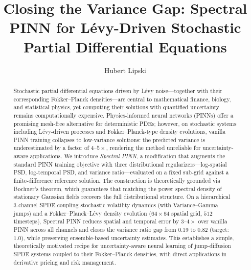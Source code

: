 \documentclass[times,12pt]{elsarticle}
\begin{document}
\begin{frontmatter}


\title{Closing the Variance Gap: Spectral PINN for L\'evy-Driven Stochastic Partial Differential Equations}

\author{Hubert Lipski}



\begin{abstract}
Stochastic partial differential equations driven by L\'evy noise---together with their corresponding Fokker--Planck densities---are central to mathematical finance, biology, and statistical physics, yet computing their solutions with quantified uncertainty remains computationally expensive. Physics-informed neural networks (PINNs) offer a promising mesh-free alternative for deterministic PDEs; however, on stochastic systems including L\'evy-driven processes and Fokker--Planck-type density evolutions, vanilla PINN training collapses to low-variance solutions: the predicted variance is underestimated by a factor of $4$--$5\times$, rendering the method unreliable for uncertainty-aware applications.
We introduce \emph{Spectral PINN}, a modification that augments the standard PINN training objective with three distributional regularizers---log-spatial PSD, log-temporal PSD, and variance ratio---evaluated on a fixed sub-grid against a finite-difference reference solution. The construction is theoretically grounded via Bochner's theorem, which guarantees that matching the power spectral density of stationary Gaussian fields recovers the full distributional structure.
On a hierarchical 3-channel SPDE coupling stochastic volatility dynamics (with Variance--Gamma jumps) and a Fokker--Planck--L\'evy density evolution ($64\times64$ spatial grid, $512$ timesteps), Spectral PINN reduces spatial and temporal error by $3$--$4\times$ over vanilla PINN across all channels and closes the variance ratio gap from $0.19$ to $0.82$ (target: $1.0$), while preserving ensemble-based uncertainty estimates.
This establishes a simple, theoretically motivated recipe for uncertainty-aware neural learning of jump-diffusion SPDE systems coupled to their Fokker--Planck densities, with direct applications in derivative pricing and risk management.
\end{abstract}


\end{frontmatter}
\end{document}
